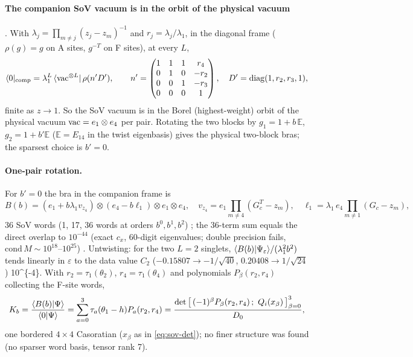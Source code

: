 \paragraph{The companion SoV vacuum is in the orbit of the physical vacuum} \ex. With $\lambda_j=\prod_{m\ne j}(z_j-z_m)^{-1}$ and $r_j=\lambda_j/\lambda_1$, in the diagonal frame
($\rho(g)=g$ on A sites, $g^{-T}$ on F sites), at every $L$,
\begin{equation}\label{eq:sov-orbit}
 \langle0|_{\rm comp}=\lambda_1^{L}\,\langle\mathrm{vac}^{\otimes L}|\,\rho(n'D'),\qquad
 n'=\begin{pmatrix}1&1&1&r_4\\0&1&0&-r_2\\0&0&1&-r_3\\0&0&0&1\end{pmatrix},\quad D'=\mathrm{diag}(1,r_2,r_3,1),
\end{equation}
finite as $z\to1$. So the SoV vacuum is in the Borel (highest-weight) orbit of the physical vacuum $\mathrm{vac}=e_1\otimes e_4$ per pair. Rotating the two blocks by $g_1=1+b\,\mathbb E$, $g_2=1+b'\mathbb E$
($\mathbb E=E_{14}$ in the twist eigenbasis) gives the physical two-block bras; the sparsest choice is $b'=0$.

\paragraph{One-pair rotation.} For $b'=0$ the bra in the companion frame is
\begin{equation}
 B(b)=(e_1+b\lambda_1v_{z_4})\otimes(e_4-b\ell_1)\otimes e_1\otimes e_4,\quad v_{z_4}=e_1\prod_{m\ne4}(G_c^T-z_m),\quad\ell_1=\lambda_1\,e_4\prod_{m\ne1}(G_c-z_m),
\end{equation}
36 SoV words (1, 17, 36 words at orders $b^0,b^1,b^2$) \ex; the 36-term sum equals the direct overlap to $10^{-44}$ (exact $c_x$, 60-digit eigenvalues; double precision fails, $\mathrm{cond}\,M\sim10^{18}$--$10^{25}$) \hp. Untwisting: for the two $L=2$ singlets, $\langle B(b)|\Psi_\varepsilon\rangle/(\lambda_1^2b^2)$ tends linearly in $\varepsilon$ to the data value $C_2$
($-0.15807\to-1/\sqrt{40}$, $0.20408\to1/\sqrt{24}$) \num{10^{-4}}. With $r_2=\tau_1(\theta_2)$, $r_4=\tau_1(\theta_4)$ and polynomials $P_\beta(r_2,r_4)$ collecting the F-site words,
\begin{equation}
 K_b=\frac{\langle B(b)|\Psi\rangle}{\langle0|\Psi\rangle}=\sum_{a=0}^3\tau_a(\theta_1-h)P_a(r_2,r_4)=\frac{\det\big[\,(-1)^\beta P_\beta(r_2,r_4)\,;\ Q_i(x_\beta)\,\big]_{\beta=0}^{3}}{D_0},
\end{equation}
one bordered $4\times4$ Casoratian ($x_\beta$ as in \eqref{eq:sov-det}); no finer structure was found (no sparser word basis, tensor rank 7).

